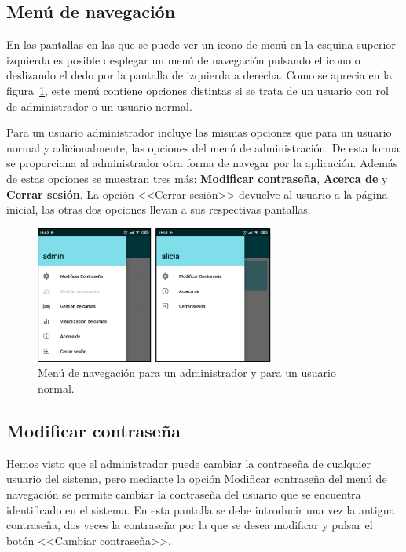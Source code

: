 \subsection{Menú de navegación}

En las pantallas en las que se puede ver un icono de menú en la esquina superior izquierda es posible desplegar un menú de navegación pulsando el icono o deslizando el dedo por la pantalla de izquierda a derecha. Como se aprecia en la figura~\ref{fig:menunavegacion}, este menú contiene opciones distintas si se trata de un usuario con rol de administrador o un usuario normal. 

Para un usuario administrador incluye las mismas opciones que para un usuario normal y adicionalmente, las opciones del menú de administración. De esta forma se proporciona al administrador otra forma de navegar por la aplicación. Además de estas opciones se muestran tres más: \textbf{Modificar contraseña}, \textbf{Acerca de} y \textbf{Cerrar sesión}. La opción <<Cerrar sesión>> devuelve al usuario a la página inicial, las otras dos opciones llevan a sus respectivas pantallas.  

\begin{figure}[H]
	\centering
	\includegraphics[width=0.7\textwidth]{../img/menunavegacion.png}
	\caption{Menú de navegación para un administrador y para un usuario normal.}
	\label{fig:menunavegacion}
\end{figure} 

\subsection{Modificar contraseña}

Hemos visto que el administrador puede cambiar la contraseña de cualquier usuario del sistema, pero mediante la opción Modificar contraseña del menú de navegación se permite cambiar la contraseña del usuario que se encuentra identificado en el sistema. En esta pantalla se debe introducir una vez la antigua contraseña, dos veces la contraseña por la que se desea modificar y pulsar el botón <<Cambiar contraseña>>. 

